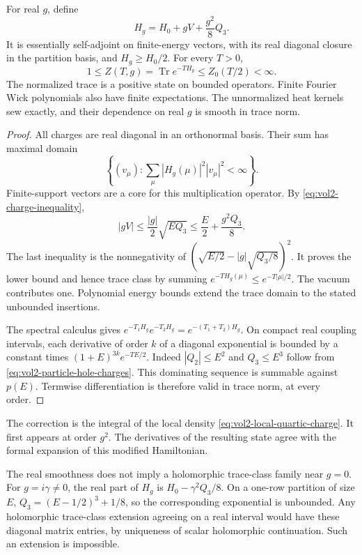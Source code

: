 \begin{theorem}\label{thm:vol2-local-stable-state}
For real \(g\), define
\begin{equation}\label{eq:vol2-local-stable-hamiltonian}
 H_g=H_0+gV+\frac{g^2}{8}Q_3.
\end{equation}
It is essentially self-adjoint on finite-energy vectors, with its
real diagonal closure in the partition basis, and
\(H_g\geq H_0/2\). For every \(T>0\),
\[
 1\leq Z(T,g)=\operatorname{Tr}e^{-TH_g}\leq Z_0(T/2)<\infty.
\]
The normalized trace is a positive state on bounded operators.
Finite Fourier Wick polynomials also have finite expectations.
The unnormalized heat kernels sew exactly, and their dependence
on real \(g\) is smooth in trace norm.
\end{theorem}

\begin{proof}
All charges are real diagonal in an orthonormal basis. Their sum
has maximal domain
\[
 \left\{(v_\mu):\sum_\mu|H_g(\mu)|^2|v_\mu|^2<\infty\right\}.
\]
Finite-support vectors are a core for this multiplication operator.
By \eqref{eq:vol2-charge-inequality},
\[
 |gV|\leq\frac{|g|}{2}\sqrt{E Q_3}
       \leq\frac E2+\frac{g^2Q_3}{8}.
\]
The last inequality is the nonnegativity of
\((\sqrt{E/2}-|g|\sqrt{Q_3/8})^2\).
It proves the lower bound and hence trace class by summing
\(e^{-TH_g(\mu)}\leq e^{-T|\mu|/2}\).
The vacuum contributes one. Polynomial energy bounds extend the
trace domain to the stated unbounded insertions.

The spectral calculus gives
\(e^{-T_1H_g}e^{-T_2H_g}=e^{-(T_1+T_2)H_g}\).
On compact real coupling intervals, each derivative of order \(k\)
of a diagonal exponential is bounded by a constant times
\((1+E)^{3k}e^{-TE/2}\). Indeed
\(|Q_2|\leq E^2\) and \(Q_3\leq E^3\) follow from
\eqref{eq:vol2-particle-hole-charges}. This dominating sequence is
summable against \(p(E)\). Termwise differentiation is therefore
valid in trace norm, at every order.
\end{proof}

The correction is the integral of the local density
\eqref{eq:vol2-local-quartic-charge}. It first appears at order
\(g^2\). The derivatives of the resulting state agree with the
formal expansion of this modified Hamiltonian.

The real smoothness does not imply a holomorphic trace-class family
near \(g=0\). For \(g=i\gamma\ne0\), the real part of
\(H_g\) is \(H_0-\gamma^2Q_3/8\). On a one-row partition
of size \(E\),
\(Q_3=(E-1/2)^3+1/8\), so the corresponding exponential is
unbounded. Any holomorphic trace-class extension agreeing on a real
interval would have these diagonal matrix entries, by uniqueness
of scalar holomorphic continuation. Such an extension is impossible.

